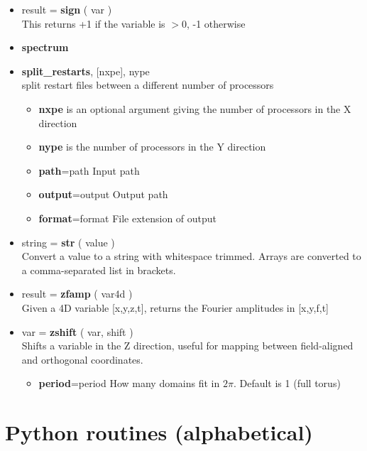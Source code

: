\documentclass[12pt]{article}
\begin{document}
\begin{itemize}
\begin{itemize}
  \end{itemize}
%
\item result = {\bf sign} ( var ) \\
  This returns +1 if the variable is $> 0$, -1 otherwise
\item {\bf spectrum}
\item {\bf split\_restarts}, [nxpe], nype \\ split restart files between a
    different number of processors
  \begin{itemize}
  \item {\bf nxpe} is an optional argument giving the number of processors in
      the X direction
  \item {\bf nype} is the number of processors in the Y direction
  \item {\bf path}=path      Input path
  \item {\bf output}=output  Output path
  \item {\bf format}=format  File extension of output
  \end{itemize}
%
\item string = {\bf str} ( value ) \\
  Convert a value to a string with whitespace trimmed. Arrays are converted to
  a comma-separated list in brackets.
\item result = {\bf zfamp} ( var4d )\\
  Given a 4D variable [x,y,z,t], returns the Fourier amplitudes in [x,y,f,t]
\item var = {\bf zshift} ( var, shift ) \\
  Shifts a variable in the Z direction, useful for mapping between
  field-aligned and orthogonal coordinates.
  \begin{itemize}
  \item {\bf period}=period  How many domains fit in $2\pi$. Default is 1 (full
      torus)
  \end{itemize}
%
\end{itemize}
%





\section{Python routines (alphabetical)}
%
\label{apx:py_routines}
%
\end{document}
